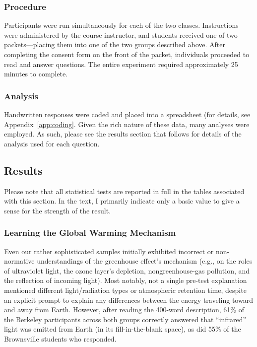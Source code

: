 \subsubsection{Procedure}

Participants were run simultaneously for each of the two classes. Instructions
were administered by the course instructor, and students received one of two
packets---placing them into one of the two groups described above. After
completing the consent form on the front of the packet, individuals proceeded to
read and answer questions. The entire experiment required approximately
25 minutes to complete.

\subsubsection{Analysis}

Handwritten responses were coded and placed into a spreadsheet (for details, see
Appendix~\ref{app:coding}. Given the rich nature of these data, many analyses
were employed. As such, please see the results section that follows for details
of the analysis used for each question.

\subsection{Results}

Please note that all statistical tests are reported in full in the tables
associated with this section. In the text, I primarily indicate only a basic
value to give a sense for the strength of the result.

\subsubsection{Learning the Global Warming Mechanism}

Even our rather sophisticated samples initially exhibited incorrect or
non-normative understandings of the greenhouse effect’s mechanism (e.g., on the
roles of ultraviolet light, the ozone layer’s depletion, nongreenhouse-gas
pollution, and the reflection of incoming light). Most notably, not a single
pre-test explanation mentioned different light/radiation types or atmospheric
retention time, despite an explicit prompt to explain any differences between
the energy traveling toward and away from Earth. However, after reading the
400-word description, 61\% of the Berkeley participants across both groups
correctly answered that “infrared” light was emitted from Earth (in its
fill-in-the-blank space), as did 55\% of the Brownsville students who responded.

